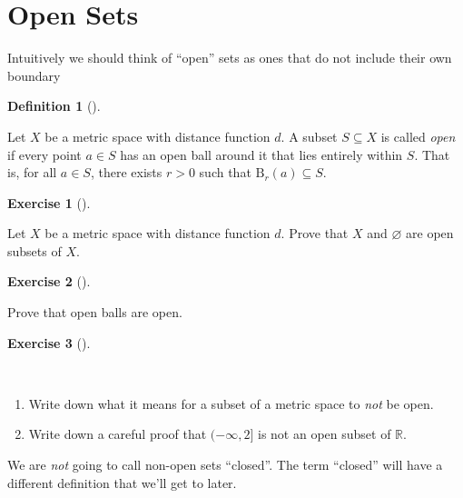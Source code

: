 \documentclass[
  letterpaper,
  DIV=11,
  numbers=noendperiod]{scrreprt}
\providecommand{\tightlist}{%
  \setlength{\itemsep}{0pt}\setlength{\parskip}{0pt}}
\def\R{\mathbb R}
\newcommand{\bee}{\mathrm{B}}
\theoremstyle{plain}
\theoremstyle{definition}
\newtheorem{exercise}{Exercise}[chapter]
\theoremstyle{plain}
\theoremstyle{plain}
\theoremstyle{definition}
\theoremstyle{definition}
\newtheorem{definition}{Definition}[chapter]
\theoremstyle{remark}
\begin{document}
\section{Open Sets}\label{open-sets-1}

Intuitively we should think of ``open'' sets as ones that do not include
their own boundary

\begin{definition}[]\protect\hypertarget{def-open-set}{}\label{def-open-set}

Let \(X\) be a metric space with distance function \(d\). A subset
\(S\subseteq X\) is called \emph{open} if every point \(a\in S\) has an
open ball around it that lies entirely within \(S\). That is, for all
\(a\in S\), there exists \(r>0\) such that \(\bee_r(a)\subseteq S\).

\end{definition}

\begin{exercise}[]\protect\hypertarget{exr-empty-and-whole-ms-open}{}\label{exr-empty-and-whole-ms-open}

Let \(X\) be a metric space with distance function \(d\). Prove that
\(X\) and \(\varnothing\) are open subsets of \(X\).

\end{exercise}

\begin{exercise}[]\protect\hypertarget{exr-open-balls-are-open}{}\label{exr-open-balls-are-open}

Prove that open balls are open.

\end{exercise}

\begin{exercise}[]\protect\hypertarget{exr-open-negation}{}\label{exr-open-negation}

~

\begin{enumerate}
\def\labelenumi{\arabic{enumi}.}
\tightlist
\item
  Write down what it means for a subset of a metric space to \emph{not}
  be open.
\item
  Write down a careful proof that \((-\infty,2]\) is not an open subset
  of \(\R\).
\end{enumerate}

\end{exercise}

\begin{tcolorbox}[enhanced jigsaw, titlerule=0mm, opacitybacktitle=0.6, leftrule=.75mm, bottomrule=.15mm, left=2mm, arc=.35mm, colback=white, rightrule=.15mm, colframe=quarto-callout-caution-color-frame, toptitle=1mm, breakable, opacityback=0, colbacktitle=quarto-callout-caution-color!10!white, bottomtitle=1mm, title=\textcolor{quarto-callout-caution-color}{\faFire}\hspace{0.5em}{Caution}, coltitle=black, toprule=.15mm]

We are \emph{not} going to call non-open sets ``closed''. The term
``closed'' will have a different definition that we'll get to later.

\end{tcolorbox}
\end{document}

